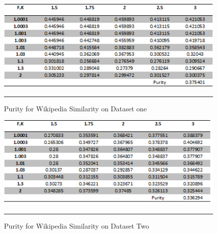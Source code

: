 \begin{figure}[htbp]
	\centering
		\includegraphics{./Figures/wiki_Purity_DS1.png}
		\rule{35em}{0.5pt}
	\caption[Purity for Wikipedia Similarity on Dataset one]{Purity for Wikipedia Similarity on Dataset one}
	\label{fig:F2}
\end{figure}

\begin{figure}[htbp]
	\centering
		\includegraphics{./Figures/wiki_Purity_DS2.png}
		\rule{35em}{0.5pt}
	\caption[Purity for Wikipedia Similarity on Dataset one]{Purity for Wikipedia Similarity on Dataset Two}
	\label{fig:F3}
\end{figure}

